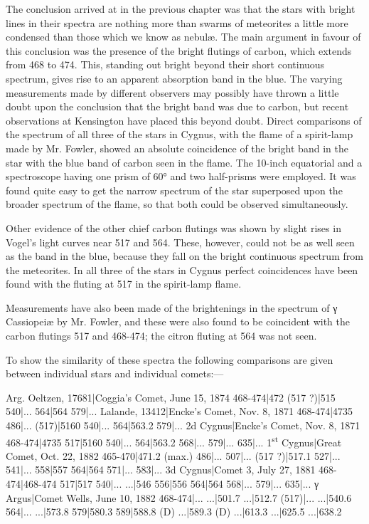 \documentclass[a4paper, 12pt, oneside, polutonikogreek, english]{article}
\begin{document}
The conclusion arrived at in the previous chapter was that the stars with bright lines in their spectra are nothing more than swarms of meteorites a little more condensed than those which we know as nebulæ. The main argument in favour of this conclusion was the presence of the bright flutings of carbon, which extends from 468 to 474. This, standing out bright beyond their short continuous spectrum, gives rise to an apparent absorption band in the blue. The varying measurements made by different observers may possibly have thrown a little doubt upon the conclusion that the bright band was due to carbon, but recent observations at Kensington have placed this beyond doubt. Direct comparisons of the spectrum of all three of the stars in Cygnus, with the flame of a spirit-lamp made by Mr. Fowler, showed an absolute coincidence of the bright band in the star with the blue band of carbon seen in the flame. The 10-inch equatorial and a spectroscope having one prism of 60° and two half-prisms were employed. It was found quite easy to get the narrow spectrum of the star superposed upon the broader spectrum of the flame, so that both could be observed simultaneously.

Other evidence of the other chief carbon flutings was shown by slight rises in Vogel's light curves near 517 and 564. These, however, could not be as well seen as the band in the blue, because they fall on the bright continuous spectrum from the meteorites. In all three of the stars in Cygnus perfect coincidences have been found with the fluting at 517 in the spirit-lamp flame.

Measurements have also been made of the brightenings in the spectrum of γ Cassiopeiæ by Mr. Fowler, and these were also found to be coincident with the carbon flutings 517 and 468-474; the citron fluting at 564 was not seen.

To show the similarity of these spectra the following comparisons are given between individual stars and individual comets:---

Arg. Oeltzen, 17681|Coggia's Comet, June 15, 1874 
468-474|472 
(517 ?)|515 
540|... 
564|564 
579|... 
Lalande, 13412|Encke's Comet, Nov. 8, 1871 
468-474|4735 
486|... 
(517)|5160 
540|... 
564|563.2 
579|... 
2d Cygnus|Encke's Comet, Nov. 8, 1871 
468-474|4735 
517|5160 
540|... 
564|563.2 
568|... 
579|... 
635|... 
1\textsuperscript{st} Cygnus|Great Comet, Oct. 22, 1882 
465-470|471.2 (max.) 
486|... 
507|... 
(517 ?)|517.1 
527|... 
541|... 
558|557 
564|564 
571|... 
583|... 
3d Cygnus|Comet 3, July 27, 1881 
468-474|468-474 
517|517 
540|... 
...|546 
556|556 
564|564 
568|... 
579|... 
635|... 
γ Argus|Comet Wells, June 10, 1882 
468-474|... 
...|501.7 
...|512.7 
(517)|... 
...|540.6 
564|... 
...|573.8 
579|580.3 
589|588.8 (D) 
...|589.3 (D) 
...|613.3 
...|625.5 
...|638.2 
\end{document}
